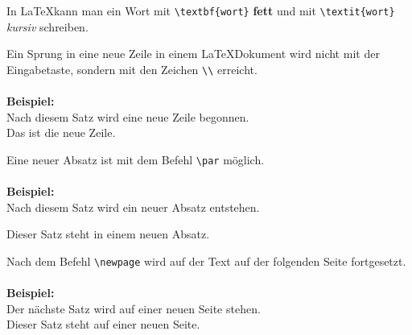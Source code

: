 In \LaTeX kann man ein Wort mit \lstinline|\textbf{wort}| \textbf{fett} und mit
\lstinline|\textit{wort}| \textit{kursiv} schreiben.\\
\par
Ein Sprung in eine neue Zeile in einem \LaTeX Dokument wird nicht mit
der Eingabetaste, sondern mit den Zeichen \lstinline|\\| erreicht.\\
\\
\textbf{Beispiel:}\\
Nach diesem Satz wird eine neue Zeile begonnen.\\
Das ist die neue Zeile.\\
\par
Eine neuer Absatz ist mit dem Befehl \lstinline|\par| möglich.\\
\\
\textbf{Beispiel:}\\
Nach diesem Satz wird ein neuer Absatz entstehen.\\
\par
Dieser Satz steht in einem neuen Absatz.\\
\par
Nach dem Befehl \lstinline|\newpage| wird auf der Text auf der folgenden Seite fortgesetzt.\\
\\
\textbf{Beispiel:}\\
Der nächste Satz wird auf einer neuen Seite stehen.\\
\newpage
Dieser Satz steht auf einer neuen Seite.




